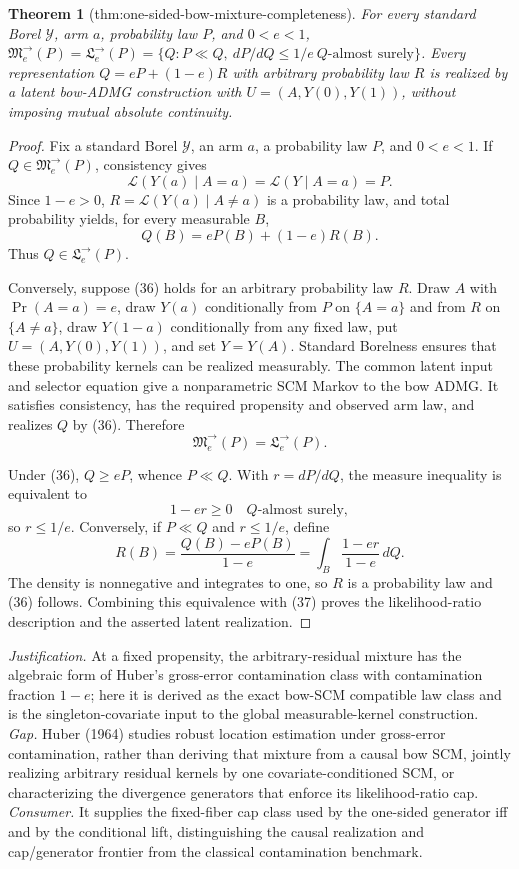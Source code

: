 \documentclass{article}
\newtheorem{theorem}{Theorem}
\begin{document}
\begin{theorem}[thm:one-sided-bow-mixture-completeness]\label{thm:one-sided-bow-mixture-completeness}
For every standard Borel \(\mathcal Y\), arm \(a\), probability law \(P\), and \(0<e<1\), \(\mathfrak M^{\to}_e(P)=\mathfrak L^{\to}_e(P)=\{Q:P\ll Q,\ dP/dQ\le1/e\ Q\text{-almost surely}\}\). Every representation \(Q=eP+(1-e)R\) with arbitrary probability law \(R\) is realized by a latent bow-ADMG construction with \(U=(A,Y(0),Y(1))\), without imposing mutual absolute continuity.
\end{theorem}
\begin{proof}
Fix a standard Borel \(\mathcal Y\), an arm \(a\), a probability law \(P\), and \(0<e<1\).  If \(Q\in\mathfrak M^{\to}_e(P)\), consistency gives
\[
 \mathcal L(Y(a)\mid A=a)=\mathcal L(Y\mid A=a)=P.
\]
Since \(1-e>0\), \(R=\mathcal L(Y(a)\mid A\ne a)\) is a probability law, and total probability yields, for every measurable \(B\),
\[
 Q(B)=eP(B)+(1-e)R(B). \tag{36}
\]
Thus \(Q\in\mathfrak L^{\to}_e(P)\).

Conversely, suppose (36) holds for an arbitrary probability law \(R\).  Draw \(A\) with \(\Pr(A=a)=e\), draw \(Y(a)\) conditionally from \(P\) on \(\{A=a\}\) and from \(R\) on \(\{A\ne a\}\), draw \(Y(1-a)\) conditionally from any fixed law, put \(U=(A,Y(0),Y(1))\), and set \(Y=Y(A)\).  Standard Borelness ensures that these probability kernels can be realized measurably.  The common latent input and selector equation give a nonparametric SCM Markov to the bow ADMG.  It satisfies consistency, has the required propensity and observed arm law, and realizes \(Q\) by (36).  Therefore
\[
 \mathfrak M^{\to}_e(P)=\mathfrak L^{\to}_e(P). \tag{37}
\]

Under (36), \(Q\ge eP\), whence \(P\ll Q\).  With \(r=dP/dQ\), the measure inequality is equivalent to
\[
 1-er\ge0\quad Q\text{-almost surely},
\]
so \(r\le1/e\).  Conversely, if \(P\ll Q\) and \(r\le1/e\), define
\[
 R(B)=\frac{Q(B)-eP(B)}{1-e}
     =\int_B\frac{1-er}{1-e}\,dQ.
\]
The density is nonnegative and integrates to one, so \(R\) is a probability law and (36) follows.  Combining this equivalence with (37) proves the likelihood-ratio description and the asserted latent realization.
\end{proof}
\par\smallskip\noindent \textit{Justification.} At a fixed propensity, the arbitrary-residual mixture has the algebraic form of Huber's gross-error contamination class with contamination fraction \(1-e\); here it is derived as the exact bow-SCM compatible law class and is the singleton-covariate input to the global measurable-kernel construction. \textit{Gap.} Huber (1964) studies robust location estimation under gross-error contamination, rather than deriving that mixture from a causal bow SCM, jointly realizing arbitrary residual kernels by one covariate-conditioned SCM, or characterizing the divergence generators that enforce its likelihood-ratio cap. \textit{Consumer.} It supplies the fixed-fiber cap class used by the one-sided generator iff and by the conditional lift, distinguishing the causal realization and cap/generator frontier from the classical contamination benchmark.
\end{document}
